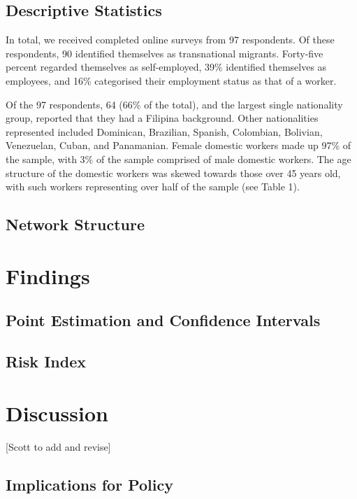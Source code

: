 \documentclass[
  12pt,
]{article}
\theoremstyle{plain}
\theoremstyle{definition}
\begin{document}
\subsection{Descriptive Statistics}\label{descriptive-statistics}

In total, we received completed online surveys from 97 respondents. Of
these respondents, 90 identified themselves as transnational migrants.
Forty-five percent regarded themselves as self-employed, 39\% identified
themselves as employees, and 16\% categorised their employment status as
that of a worker.

Of the 97 respondents, 64 (66\% of the total), and the largest single
nationality group, reported that they had a Filipina background. Other
nationalities represented included Dominican, Brazilian, Spanish,
Colombian, Bolivian, Venezuelan, Cuban, and Panamanian. Female domestic
workers made up 97\% of the sample, with 3\% of the sample comprised of
male domestic workers. The age structure of the domestic workers was
skewed towards those over 45 years old, with such workers representing
over half of the sample (see Table 1).

\subsection{Network Structure}\label{network-structure}

\section{Findings}\label{findings}

\subsection{Point Estimation and Confidence
Intervals}\label{point-estimation-and-confidence-intervals}

\subsection{Risk Index}\label{risk-index}

\section{Discussion}\label{discussion}

{[}Scott to add and revise{]}

\subsection{Implications for Policy}\label{implications-for-policy}
\end{document}
